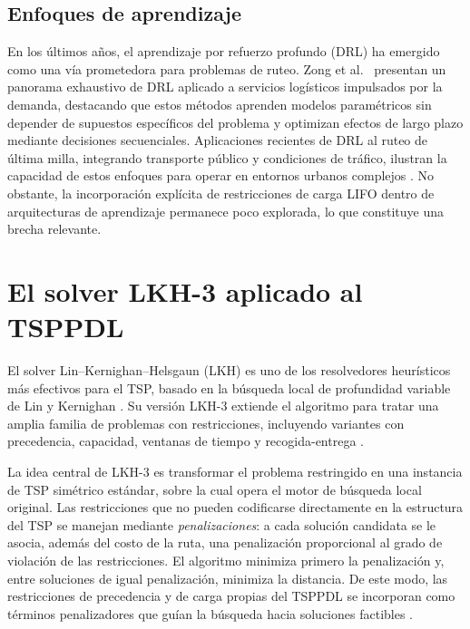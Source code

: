 \documentclass[conference]{IEEEtran}
\begin{document}
\subsection{Enfoques de aprendizaje}
En los últimos años, el aprendizaje por refuerzo profundo (DRL) ha emergido como una vía prometedora para problemas de ruteo. Zong et al.\ \cite{zong2025} presentan un panorama exhaustivo de DRL aplicado a servicios logísticos impulsados por la demanda, destacando que estos métodos aprenden modelos paramétricos sin depender de supuestos específicos del problema y optimizan efectos de largo plazo mediante decisiones secuenciales. Aplicaciones recientes de DRL al ruteo de última milla, integrando transporte público y condiciones de tráfico, ilustran la capacidad de estos enfoques para operar en entornos urbanos complejos \cite{elamrani2025}. No obstante, la incorporación explícita de restricciones de carga LIFO dentro de arquitecturas de aprendizaje permanece poco explorada, lo que constituye una brecha relevante.

\section{El solver LKH-3 aplicado al TSPPDL}\label{sec:lkh}
El solver Lin--Kernighan--Helsgaun (LKH) es uno de los resolvedores heurísticos más efectivos para el TSP, basado en la búsqueda local de profundidad variable de Lin y Kernighan \cite{helsgaun2017}. Su versión LKH-3 extiende el algoritmo para tratar una amplia familia de problemas con restricciones, incluyendo variantes con precedencia, capacidad, ventanas de tiempo y recogida-entrega \cite{helsgaun2017}.

La idea central de LKH-3 es transformar el problema restringido en una instancia de TSP simétrico estándar, sobre la cual opera el motor de búsqueda local original. Las restricciones que no pueden codificarse directamente en la estructura del TSP se manejan mediante \textit{penalizaciones}: a cada solución candidata se le asocia, además del costo de la ruta, una penalización proporcional al grado de violación de las restricciones. El algoritmo minimiza primero la penalización y, entre soluciones de igual penalización, minimiza la distancia. De este modo, las restricciones de precedencia y de carga propias del TSPPDL se incorporan como términos penalizadores que guían la búsqueda hacia soluciones factibles \cite{helsgaun2017}.
\end{document}
